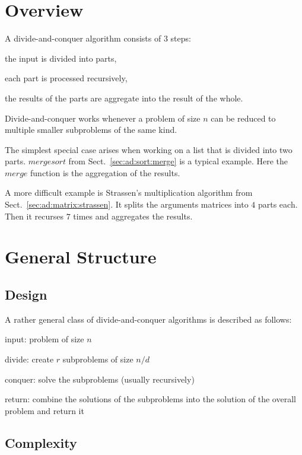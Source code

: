 \section{Overview}

A divide-and-conquer algorithm consists of $3$ steps:
\begin{compactenum}
 \item the input is divided into parts,
 \item each part is processed recursively,
 \item the results of the parts are aggregate into the result of the whole.
\end{compactenum}
Divide-and-conquer works whenever a problem of size $n$ can be reduced to multiple smaller subproblems of the same kind.

The simplest special case arises when working on a list that is divided into two parts.
$mergesort$ from Sect.~\ref{sec:ad:sort:merge} is a typical example.
Here the $merge$ function is the aggregation of the results. 

A more difficult example is Strassen's multiplication algorithm from Sect.~\ref{sec:ad:matrix:strassen}.
It splits the arguments matrices into $4$ parts each.
Then it recurses $7$ times and aggregates the results.

\section{General Structure}

\subsection{Design}

A rather general class of divide-and-conquer algorithms is described as follows:
\begin{compactenum}
 \item input: problem of size $n$
 \item divide: create $r$ subproblems of size $n/d$
 \item conquer: solve the subproblems (usually recursively)
 \item return: combine the solutions of the subproblems into the solution of the overall problem and return it
\end{compactenum}

\subsection{Complexity}

